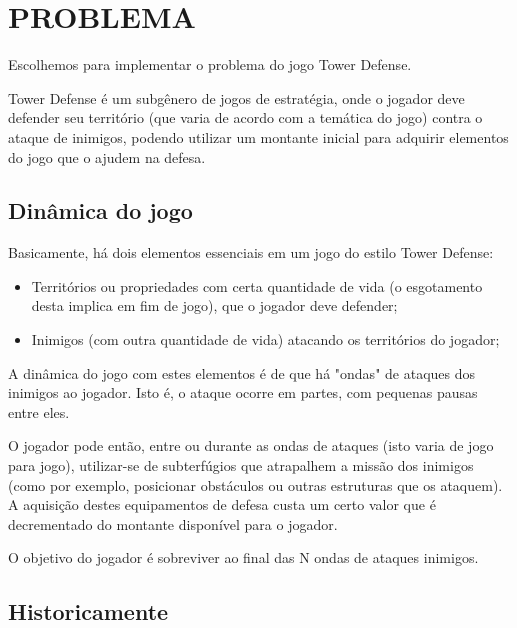 \documentclass[rel_mlp]{iiufrgs}
\begin{document}
\chapter{PROBLEMA} \label{intro}

Escolhemos para implementar o problema do jogo Tower Defense.

Tower Defense é um subgênero de jogos de estratégia, onde o jogador deve defender seu território (que varia de acordo com a temática do jogo) contra o ataque de inimigos, podendo utilizar um montante inicial para adquirir elementos do jogo que o ajudem na defesa.



\section{Dinâmica do jogo}

Basicamente, há dois elementos essenciais em um jogo do estilo Tower Defense:

\begin{itemize}[leftmargin=3em]
\setlength{\itemindent}{1em}

    \item Territórios ou propriedades com certa quantidade de vida (o esgotamento desta implica em fim de jogo), que o jogador deve defender;

    \item Inimigos (com outra quantidade de vida) atacando os territórios do jogador;

\end{itemize}

A dinâmica do jogo com estes elementos é de que há "ondas" de ataques dos inimigos ao jogador. Isto é, o ataque ocorre em partes, com pequenas pausas entre eles.

O jogador pode então, entre ou durante as ondas de ataques (isto varia de jogo para jogo), utilizar-se de subterfúgios que atrapalhem a missão dos inimigos (como por exemplo, posicionar obstáculos ou outras estruturas que os ataquem). A aquisição destes equipamentos de defesa custa um certo valor que é decrementado do montante disponível para o jogador.

O objetivo do jogador é sobreviver ao final das N ondas de ataques inimigos.


\section{Historicamente}
\end{document}
